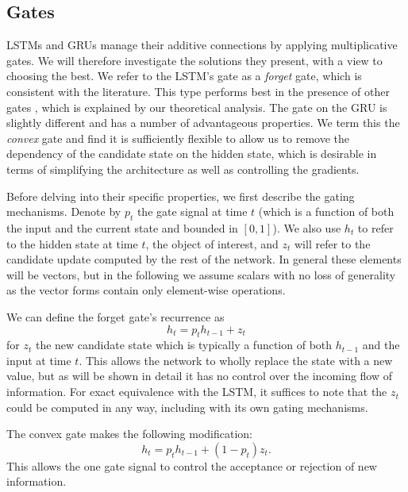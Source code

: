 \subsection{Gates}\label{sec:gate}
LSTMs and GRUs manage their additive connections by applying multiplicative gates. We will therefore
investigate the solutions they present, with a view to choosing the best. We refer to the LSTM's gate
as a \emph{forget} gate, which is consistent with the literature. This type performs best
 in the presence of other gates \autocite{Greff2016, Jozefowicz2015}, which is explained by our 
 theoretical analysis.
The gate on the GRU is slightly
different and has a number of advantageous properties. We term this the \emph{convex} gate and find it
is sufficiently flexible to allow us to remove the dependency of the candidate state on the hidden
state, which is desirable in terms of simplifying the architecture as well as controlling the gradients.

Before delving into their specific properties, we first describe the gating mechanisms.
Denote by \(p_t\) the gate signal at time \(t\) (which is a
function of both the input and the current state and bounded in \([0, 1]\)). We also use
\(h_t\) to refer to the hidden state at time \(t\), the object of interest, and \(z_t\) will
refer to the candidate update computed by the rest of the network. In general these
elements will be vectors, but in the following we assume scalars with no loss of generality as
the vector forms contain only element-wise operations.

We can define the
forget gate's recurrence as
\begin{equation}
	h_t = p_th_{t-1} + z_t
	\label{eq:forgetgate}
\end{equation} for \(z_t\) the new candidate state which is typically a function of
both \(h_{t-1}\) and the input at time \(t\). This allows the network to wholly replace the
state with a new value, but as will be shown in detail it has no control over the incoming
flow of information. For exact equivalence with the LSTM, it suffices to note that the \(z_t\)
could be computed in any way, including with its own gating mechanisms.

The convex gate makes the following modification:
\begin{equation}
	h_t = p_th_{t-1} + (1-p_t)z_t.
	\label{eq:cvexgate}
\end{equation} This allows the one gate signal
to control the acceptance or rejection of new information.


